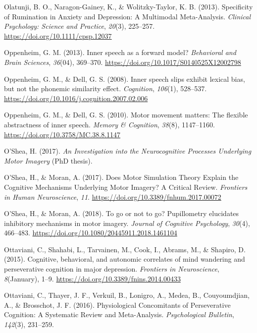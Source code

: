 \documentclass[a4paper,12pt,twoside,openright,oldfontcommands,final]{memoir}
\begin{document}
\leavevmode\hypertarget{ref-olatunji_specificity_2013}{}%
Olatunji, B. O., Naragon-Gainey, K., \& Wolitzky-Taylor, K. B. (2013). Specificity of Rumination in Anxiety and Depression: A Multimodal Meta-Analysis. \emph{Clinical Psychology: Science and Practice}, \emph{20}(3), 225--257. \url{https://doi.org/10.1111/cpsp.12037}

\leavevmode\hypertarget{ref-oppenheim_inner_2013}{}%
Oppenheim, G. M. (2013). Inner speech as a forward model? \emph{Behavioral and Brain Sciences}, \emph{36}(04), 369--370. \url{https://doi.org/10.1017/S0140525X12002798}

\leavevmode\hypertarget{ref-oppenheim_inner_2008}{}%
Oppenheim, G. M., \& Dell, G. S. (2008). Inner speech slips exhibit lexical bias, but not the phonemic similarity effect. \emph{Cognition}, \emph{106}(1), 528--537. \url{https://doi.org/10.1016/j.cognition.2007.02.006}

\leavevmode\hypertarget{ref-oppenheim_motor_2010}{}%
Oppenheim, G. M., \& Dell, G. S. (2010). Motor movement matters: The flexible abstractness of inner speech. \emph{Memory \& Cognition}, \emph{38}(8), 1147--1160. \url{https://doi.org/10.3758/MC.38.8.1147}

\leavevmode\hypertarget{ref-oshea_investigation_2017}{}%
O'Shea, H. (2017). \emph{An Investigation into the Neurocognitive Processes Underlying Motor Imagery} (PhD thesis).

\leavevmode\hypertarget{ref-oshea_does_2017}{}%
O'Shea, H., \& Moran, A. (2017). Does Motor Simulation Theory Explain the Cognitive Mechanisms Underlying Motor Imagery? A Critical Review. \emph{Frontiers in Human Neuroscience}, \emph{11}. \url{https://doi.org/10.3389/fnhum.2017.00072}

\leavevmode\hypertarget{ref-oshea_go_2018}{}%
O'Shea, H., \& Moran, A. (2018). To go or not to go? Pupillometry elucidates inhibitory mechanisms in motor imagery. \emph{Journal of Cognitive Psychology}, \emph{30}(4), 466--483. \url{https://doi.org/10.1080/20445911.2018.1461104}

\leavevmode\hypertarget{ref-Ottaviani2015}{}%
Ottaviani, C., Shahabi, L., Tarvainen, M., Cook, I., Abrams, M., \& Shapiro, D. (2015). Cognitive, behavioral, and autonomic correlates of mind wandering and perseverative cognition in major depression. \emph{Frontiers in Neuroscience}, \emph{8}(January), 1--9. \url{https://doi.org/10.3389/fnins.2014.00433}

\leavevmode\hypertarget{ref-ottaviani_physiological_2016}{}%
Ottaviani, C., Thayer, J. F., Verkuil, B., Lonigro, A., Medea, B., Couyoumdjian, A., \& Brosschot, J. F. (2016). Physiological Concomitants of Perseverative Cognition: A Systematic Review and Meta-Analysis. \emph{Psychological Bulletin}, \emph{142}(3), 231--259.
\end{document}

